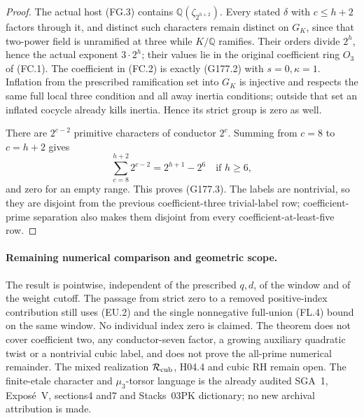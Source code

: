 \begin{proof}
The actual host (FG.3) contains $\mathbb Q(\zeta_{2^{h+2}})$.
Every stated $\delta$ with $c\leq h+2$ factors through it, and
distinct such characters remain distinct on $G_K$, since that
two-power field is unramified at three while $K/\mathbb Q$ ramifies.
Their orders divide $2^h$, hence the actual exponent $3\cdot2^h$;
their values lie in the original coefficient ring $O_3$ of (FC.1).
The coefficient in (FC.2) is exactly (G177.2) with $s=0,\kappa=1$.
Inflation from the prescribed ramification set into $G_K$ is
injective and respects the same full local three condition and
all away inertia conditions; outside that set an inflated cocycle
already kills inertia.  Hence its strict group is zero as well.

There are $2^{c-2}$ primitive characters of conductor $2^c$.
Summing from $c=8$ to $c=h+2$ gives
\[
 \sum_{c=8}^{h+2}2^{c-2}=2^{h+1}-2^6
 \quad\text{if }h\geq6,
 \tag{G177.15}
\]
and zero for an empty range.  This proves (G177.3).
The labels are nontrivial, so they are disjoint from the previous
coefficient-three trivial-label row; coefficient-prime separation
also makes them disjoint from every coefficient-at-least-five row.
\end{proof}

\paragraph{Remaining numerical comparison and geometric scope.}
The result is pointwise, independent of the prescribed $q,d$, of
the window and of the weight cutoff.  The passage from strict zero
to a removed positive-index contribution still uses (EU.2) and the
single nonnegative full-union (FL.4) bound on the same window.
No individual index zero is claimed.
The theorem does not cover coefficient two, any conductor-seven
factor, a growing auxiliary quadratic twist or a nontrivial cubic
label, and does not prove the all-prime numerical remainder.
The mixed realization $\mathcal R_{\rm cub}$, H04.4 and cubic RH
remain open.  The finite-etale character and $\mu_3$-torsor language
is the already audited SGA~1, Expos\'e~V, sections4 and7 and
Stacks~03PK dictionary; no new archival attribution is made.
